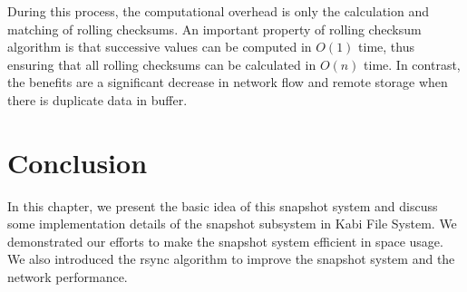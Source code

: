     During this process, the computational overhead is only the calculation and matching of rolling checksums. An important property of rolling checksum algorithm is that successive values can be computed in $O(1)$ time, thus ensuring that all rolling checksums can be calculated in $O(n)$ time. In contrast, the benefits are a significant decrease in network flow and remote storage when there is duplicate data in buffer.

\section{Conclusion}

   In this chapter, we present the basic idea of this snapshot system and discuss some implementation details of the snapshot subsystem in Kabi File System. We demonstrated our efforts to make the snapshot system efficient in space usage. We also introduced the rsync algorithm to improve the snapshot system and the network performance.

